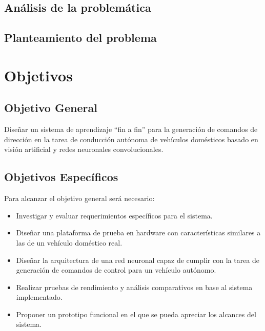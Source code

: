 \documentclass[12pt,letterpaper]{article}
\begin{document}
\subsection{Análisis de la problemática}


\subsection{Planteamiento del problema}


\section{Objetivos}
\subsection{Objetivo General}

Diseñar un sistema de aprendizaje “fin a fin” para la generación de comandos de 
dirección en la tarea de conducción autónoma de vehículos domésticos basado en 
visión artificial y redes neuronales convolucionales.

\subsection{Objetivos Específicos}
Para alcanzar el objetivo general será necesario:

\begin{itemize}
    \item Investigar y evaluar requerimientos específicos para el sistema.
    \item Diseñar una plataforma de prueba en hardware con características similares a las de un vehículo doméstico real.
    \item Diseñar la arquitectura de una red neuronal capaz de cumplir con la tarea de generación de comandos 
    de control para un vehículo autónomo.
    \item Realizar pruebas de rendimiento y análisis comparativos en base al sistema implementado.
    \item Proponer un prototipo funcional en el que se pueda apreciar los alcances del sistema.
\end{itemize}
\end{document}
